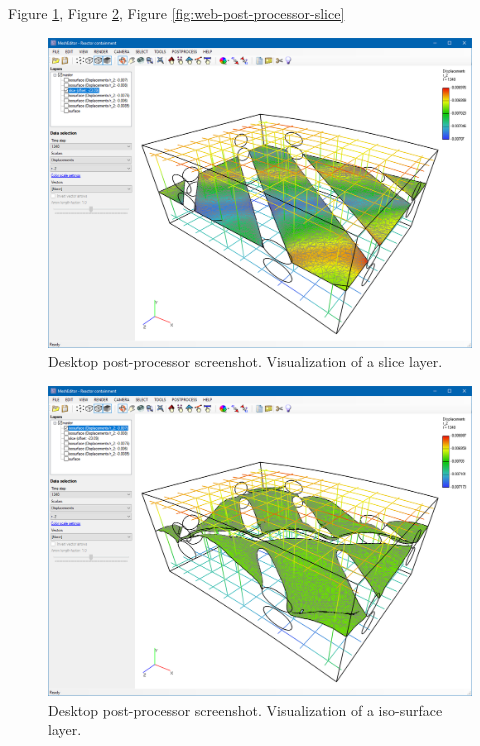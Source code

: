 Figure \ref{fig:desktop-post-processor-slice},
Figure \ref{fig:desktop-post-processor-isosurface},
Figure \ref{fig:web-post-processor-slice}


\begin{figure}[H]
    \centering
    \includegraphics[width=\textwidth]{figures/chapter-data-management/desktop-post-processor-slice}
    \decoRule
    \caption{Desktop post-processor screenshot. Visualization of a slice layer.}
    \label{fig:desktop-post-processor-slice}
\end{figure}

\begin{figure}[H]
    \centering
    \includegraphics[width=\textwidth]{figures/chapter-data-management/desktop-post-processor-isosurface}
    \decoRule
    \caption{Desktop post-processor screenshot. Visualization of a iso-surface layer.}
    \label{fig:desktop-post-processor-isosurface}
\end{figure}

